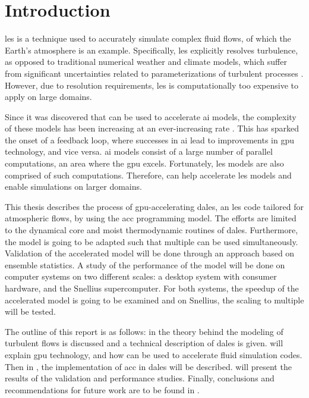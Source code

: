 \chapter{Introduction}
\acrfull{les} is a technique used to accurately simulate complex fluid flows, of which the Earth's atmosphere is an example. Specifically, \acrshort{les} explicitly resolves turbulence, as opposed to traditional numerical weather and climate models, which suffer from significant uncertainties related to parameterizations of turbulent processes \citep{schalkwijkWeatherForecastingUsing2015}. However, due to resolution requirements, \acrshort{les} is computationally too expensive to apply on large domains. 

Since it was discovered that  can be used to accelerate \acrfull{ai} models, the complexity of these models has been increasing at an ever-increasing rate \citep{mittalSurveyTechniquesOptimizing2019}. This has sparked the onset of a feedback loop, where successes in \acrshort{ai} lead to improvements in \acrshort{gpu} technology, and vice versa. \acrshort{ai} models consist of a large number of parallel computations, an area where the \acrshort{gpu} excels. Fortunately, \acrshort{les} models are also comprised of such computations. Therefore,  can help accelerate \acrshort{les} models and enable simulations on larger domains.

This thesis describes the process of \acrshort{gpu}-accelerating \acrshort{dales}, an \acrshort{les} code tailored for atmospheric flows, by using the \acrshort{acc} programming model. The efforts are limited to the dynamical core and moist thermodynamic routines of \acrshort{dales}. Furthermore, the model is going to be adapted such that multiple  can be used simultaneously. Validation of the accelerated model will be done through an approach based on ensemble statistics. A study of the performance of the model will be done on computer systems on two different scales: a desktop system with consumer hardware, and the Snellius supercomputer. For both systems, the speedup of the accelerated model is going to be examined and on Snellius, the scaling to multiple  will be tested.

The outline of this report is as follows: in  the theory behind the modeling of turbulent flows is discussed and a technical description of \acrshort{dales} is given.  will explain \acrshort{gpu} technology, and how  can be used to accelerate fluid simulation codes. Then in , the implementation of \acrshort{acc} in \acrshort{dales} will be described.  will present the results of the validation and performance studies. Finally, conclusions and recommendations for future work are to be found in .